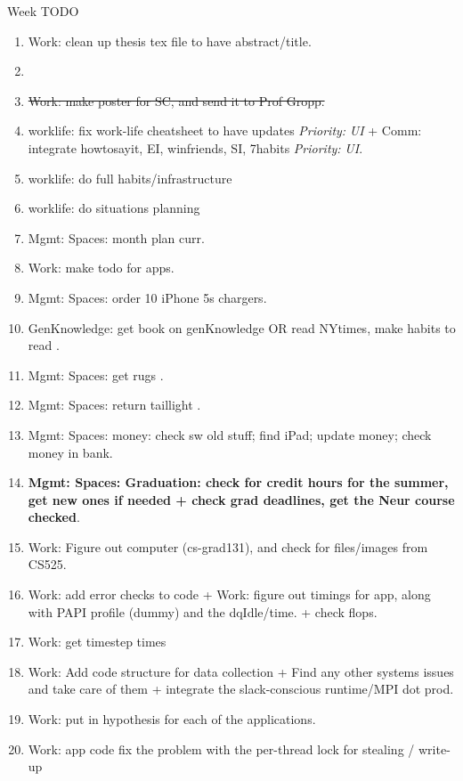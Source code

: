 \documentclass[serif,mathserif,final]{beamer}
\newcommand{\doneTask}[1]{\item \sout{#1}}
\newcommand{\priority}[1]{\textit{Priority:} \textit{#1}}
\begin{document}
\begin{frame}{}
\begin{columns}[t]
\begin{column}{0.50\linewidth}
\begin{block}{ Week TODO} 

\begin{enumerate} 
\tiny \item \tiny Work: clean up thesis tex file to have abstract/title.  
\item \tiny \doneTask{Work: make poster for SC, and send it to Prof Gropp.}

\item \tiny worklife: fix work-life cheatsheet to have updates 
\priority{UI} + Comm: integrate howtosayit, EI, winfriends, SI, 7habits \priority{UI}. 
\item \tiny worklife: do full habits/infrastructure 
\item \tiny worklife: do situations planning 
\item \tiny Mgmt: Spaces: month plan curr.  
\item \tiny Work: make todo for apps. 
\item \tiny Mgmt: Spaces: order 10 iPhone 5s chargers.
\item \tiny GenKnowledge: get book on genKnowledge OR read NYtimes, make habits to read . 
\item \tiny Mgmt: Spaces: get rugs . 
\item \tiny Mgmt: Spaces: return taillight . 
\item \tiny Mgmt: Spaces: money: check sw old stuff; find iPad; update
  money; check money in bank. 
\item \tiny \textbf{Mgmt: Spaces: Graduation: check for credit hours
  for the summer, get new ones if needed + check grad deadlines, get
  the Neur course checked}. 
\item \tiny Work: Figure out computer (cs-grad131), and check for files/images from CS525. 

\item \tiny Work: add error checks to code + Work: figure out timings
  for app, along with PAPI profile (dummy) and the dqIdle/time. + check flops. 
\item \tiny Work: get timestep times 

\item \tiny Work: Add code structure for data collection + Find any
  other systems issues and take care of them + integrate the
  slack-conscious runtime/MPI dot prod. 
\item \tiny Work: put in hypothesis for each of the applications. 
\item \tiny Work: app code fix the problem with the per-thread lock
  for stealing / write-up 


\end{enumerate}
\end{block}
\end{column}
\end{columns}
\end{frame}
\end{document}
